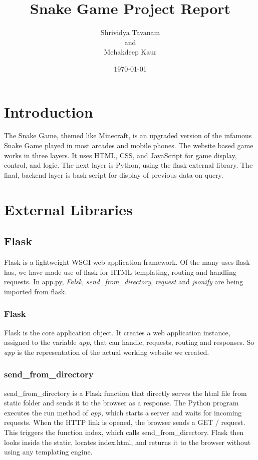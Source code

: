 \documentclass[12pt, letterpaper]{article}
\title{Snake Game Project Report}
\author{
Shrividya Tavanam \\ and \\ Mehakdeep Kaur
}
\date{\today}
\begin{document}
\maketitle


\tableofcontents

\clearpage

\section{Introduction}
The Snake Game, themed like Minecraft, is an upgraded version of the infamous Snake Game played in most arcades and mobile phones. The website based game works in three layers. It uses HTML, CSS, and JavaScript for game display, control, and logic. The next layer is Python, using the flask external library. The final, backend layer is bash script for display of previous data on query.

\section{External Libraries}
\subsection{Flask}

Flask is a lightweight WSGI web application framework\cite{flaskwebsite}. Of the many uses flask has, we have made use of flask for HTML templating, routing and handling requests. In app.py, \textit{Falsk}, \textit{send\_from\_directory}, \textit{request} and \textit{jsonify} are being imported from flask. 

\subsubsection*{Flask}

Flask is the core application object. It creates a web application instance, assigned to the variable \textit{app}, that can handle, requests, routing and responses. So \textit{app} is the representation of the actual working website we created.

\subsubsection*{send\_from\_directory}

send\_from\_directory is a Flask function that directly serves the html file from static folder and sends it to the browser as a response. The Python program executes the run method of \textit{app,} which starts a server and waits for incoming requests. When the HTTP link is opened, the browser sends a GET / request. This triggers the function index, which calls send\_from\_directory. Flask then looks inside the static, locates index.html, and returns it to the browser without using any templating engine.
\end{document}

